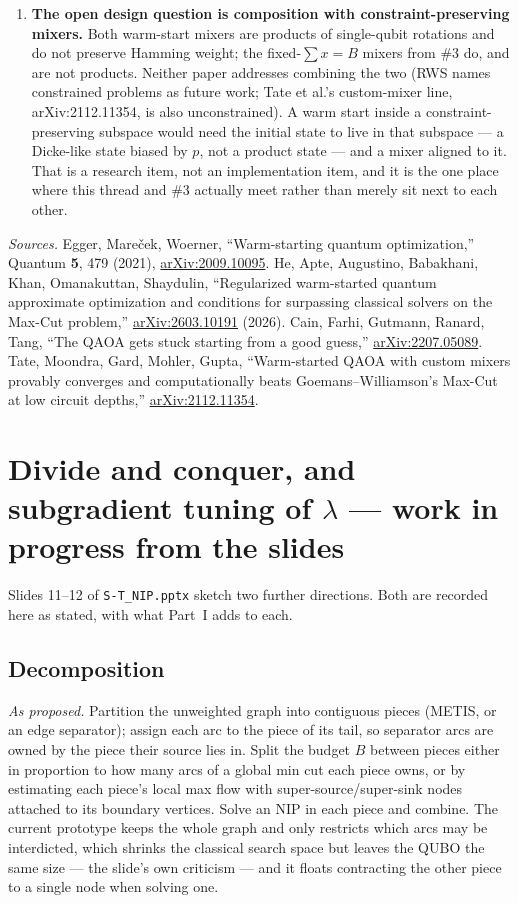 \documentclass[11pt]{article}
\newcommand{\code}[1]{\texttt{#1}}
\begin{document}
\begin{enumerate}[leftmargin=1.5em]
\item \textbf{The open design question is composition with constraint-preserving mixers.} Both warm-start mixers are products of single-qubit rotations and do not preserve Hamming weight; the fixed-$\sum x = B$ mixers from \#3 do, and are not products. Neither paper addresses combining the two (RWS names constrained problems as future work; Tate et al.'s custom-mixer line, arXiv:2112.11354, is also unconstrained). A warm start inside a constraint-preserving subspace would need the initial state to live in that subspace --- a Dicke-like state biased by $p$, not a product state --- and a mixer aligned to it. That is a research item, not an implementation item, and it is the one place where this thread and \#3 actually meet rather than merely sit next to each other.
\end{enumerate}

\emph{Sources.} Egger, Mare\v{c}ek, Woerner, ``Warm-starting quantum optimization,'' Quantum \textbf{5}, 479 (2021), \href{https://arxiv.org/abs/2009.10095}{arXiv:2009.10095}. He, Apte, Augustino, Babakhani, Khan, Omanakuttan, Shaydulin, ``Regularized warm-started quantum approximate optimization and conditions for surpassing classical solvers on the Max-Cut problem,'' \href{https://arxiv.org/abs/2603.10191}{arXiv:2603.10191} (2026). Cain, Farhi, Gutmann, Ranard, Tang, ``The QAOA gets stuck starting from a good guess,'' \href{https://arxiv.org/abs/2207.05089}{arXiv:2207.05089}. Tate, Moondra, Gard, Mohler, Gupta, ``Warm-started QAOA with custom mixers provably converges and computationally beats Goemans--Williamson's Max-Cut at low circuit depths,'' \href{https://arxiv.org/abs/2112.11354}{arXiv:2112.11354}.

\section{Divide and conquer, and subgradient tuning of $\lambda$ --- work in progress from the slides}
\label{sec:dnc}

Slides 11--12 of \code{S-T\_NIP.pptx} sketch two further directions. Both are recorded here as stated, with what Part~I adds to each.

\subsection*{Decomposition}

\emph{As proposed.} Partition the unweighted graph into contiguous pieces (METIS, or an edge separator); assign each arc to the piece of its tail, so separator arcs are owned by the piece their source lies in. Split the budget $B$ between pieces either in proportion to how many arcs of a global min cut each piece owns, or by estimating each piece's local max flow with super-source/super-sink nodes attached to its boundary vertices. Solve an NIP in each piece and combine. The current prototype keeps the whole graph and only restricts which arcs may be interdicted, which shrinks the classical search space but leaves the QUBO the same size --- the slide's own criticism --- and it floats contracting the other piece to a single node when solving one.
\end{document}
